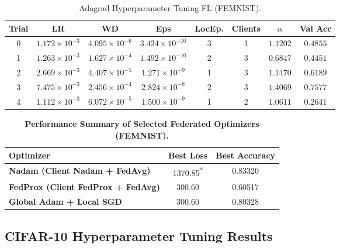 \documentclass[10pt,twocolumn,letterpaper]{article}
\begin{document}
    \begin{table}[h]
        \centering
        \caption{Adagrad Hyperparameter Tuning FL (FEMNIST).}
        \label{tab:adagrad_tuning}
        \begin{tabular}{|c|c|c|c|c|c|c|c|}
            \hline
            \textbf{Trial} & \textbf{LR} & \textbf{WD} & \textbf{Eps} & \textbf{LocEp.} & \textbf{Clients} & $\alpha$ & \textbf{Val Acc} \\
            \hline
            0 & $1.172\times 10^{-3}$ & $4.095\times 10^{-6}$ & $3.424\times 10^{-10}$ & 3 & 1 & $1.1202$ & $0.4855$ \\
            1 & $1.263\times 10^{-3}$ & $1.627\times 10^{-4}$ & $1.492\times 10^{-10}$ & 2 & 3 & $0.6847$ & $0.4451$ \\
            2 & $2.669\times 10^{-3}$ & $4.407\times 10^{-5}$ & $1.271\times 10^{-9}$ & 1 & 3 & $1.1470$ & $0.6189$ \\
            3 & $7.475\times 10^{-3}$ & $2.456\times 10^{-4}$ & $2.824\times 10^{-8}$ & 2 & 3 & $1.4069$ & $\mathbf{0.7577}$ \\
            4 & $1.112\times 10^{-3}$ & $6.072\times 10^{-5}$ & $1.500\times 10^{-9}$ & 1 & 2 & $1.0611$ & $0.2641$ \\
            \hline
        \end{tabular}
    \end{table}

    \begin{table}[h!]
    \centering
    \caption{\textbf{Performance Summary of Selected Federated Optimizers (FEMNIST).}}
    \label{tab:fedopt_summary}
    \begin{tabular}{lcc}
    \toprule
    \textbf{Optimizer} & \textbf{Best Loss} & \textbf{Best Accuracy} \\
    \midrule
    \textbf{Nadam (Client Nadam + FedAvg)} 
    & 1370.85\textsuperscript{*}
    & 0.83320 \\
    \textbf{FedProx (Client FedProx + FedAvg)} 
    & 300.60 
    & 0.60517 \\
    \textbf{Global Adam + Local SGD} 
    & 300.60 
    & 0.80328 \\
    \bottomrule
    \end{tabular}
    \end{table}

    \subsection{CIFAR-10 Hyperparameter Tuning Results}
\end{document}
